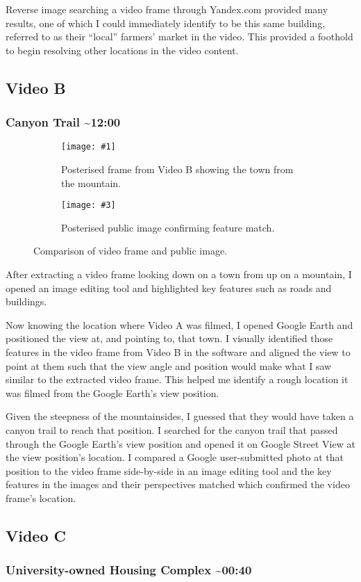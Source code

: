 \documentclass[a4paper,11pt]{report}
\newcommand{\comparison}[5] {
    \begin{figure}[htbp]
        \centering
        
        \begin{subfigure}[t]{0.45\textwidth}
            \centering
            \texttt{[image: \#1]}
            \caption{#2}
        \end{subfigure}
        \hfill
        \begin{subfigure}[t]{0.45\textwidth}
            \centering
            \texttt{[image: \#3]}
            \caption{#4}
        \end{subfigure}
    
        \caption{#5}
    \end{figure}
}
\begin{document}
Reverse image searching a video frame through Yandex.com provided many results, one of which I could immediately identify to be this same building, referred to as their “local” farmers’ market in the video. This provided a foothold to begin resolving other locations in the video content.

\subsection{Video B}

\subsubsection{Canyon Trail \~{}12:00}

\comparison
    {images/canyon-video.png}
    {Posterised frame from Video B showing the town from the mountain.}
    {images/canyon-google.png}
    {Posterised public image confirming feature match.}
    {Comparison of video frame and public image.}

After extracting a video frame looking down on a town from up on a mountain, I opened an image editing tool and highlighted key features such as roads and buildings.

Now knowing the location where Video A was filmed, I opened Google Earth and positioned the view at, and pointing to, that town. I visually identified those features in the video frame from Video B in the software and aligned the view to point at them such that the view angle and position would make what I saw similar to the extracted video frame. This helped me identify a rough location it was filmed from the Google Earth's view position.

Given the steepness of the mountainsides, I guessed that they would have taken a canyon trail to reach that position. I searched for the canyon trail that passed through the Google Earth's view position and opened it on Google Street View at the view position's location. I compared a Google user-submitted photo at that position to the video frame side-by-side in an image editing tool and the key features in the images and their perspectives matched which confirmed the video frame's location.

\subsection{Video C}

\subsubsection{University-owned Housing Complex \~{}00:40}
\end{document}
